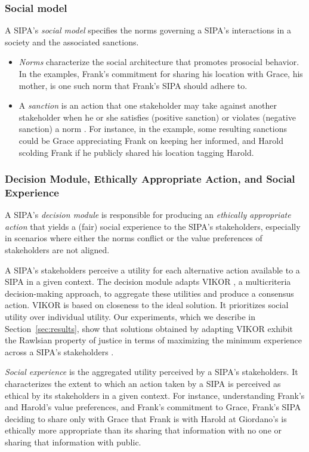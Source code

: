 \subsubsection{Social model} 
A SIPA's \emph{social model} specifies the norms governing a SIPA's interactions in a society and the associated sanctions. 
\begin{itemize}
\item \emph{Norms} characterize the social architecture that promotes prosocial behavior. In the \locationapp examples, Frank's commitment for sharing his location with Grace, his mother, is one such norm that Frank's \locationapp SIPA should adhere to. 
\item A \emph{sanction} is an action that one stakeholder may take against another stakeholder when he or she satisfies (positive sanction) or violates (negative sanction) a norm \citep{Nardin-KER16-Classifying}. For instance, in the \locationapp example, some resulting sanctions could be Grace appreciating Frank on keeping her informed, and Harold scolding Frank if he publicly shared his location tagging Harold. 
\end{itemize}

\subsubsection{Decision Module, Ethically Appropriate Action, and Social Experience}

A SIPA's \emph{decision module} is responsible for producing an \emph{ethically appropriate action} that yields a (fair) social experience to the SIPA's stakeholders, 
especially in scenarios where either the norms conflict or the value preferences 
of stakeholders are not aligned. 

A SIPA's stakeholders perceive a utility for each alternative action available to a SIPA in a given context. The decision module adapts VIKOR \citep{opricovic2004compromise}, a multicriteria decision-making approach, to aggregate these utilities and produce a consensus action. VIKOR is based on closeness to the ideal solution. It prioritizes social utility over individual utility. Our experiments, which we describe in Section~\ref{sec:results}, show that solutions obtained by \frameworkAinur adapting VIKOR exhibit the Rawlsian property of justice in terms of maximizing the minimum experience across a SIPA's stakeholders \citep{rawls1985justice,Leben2017Rawls}. 

\emph{Social experience} is the aggregated utility perceived by a SIPA's stakeholders. It characterizes the extent to which an action taken by a SIPA is perceived as ethical by its stakeholders in a given context. For instance, understanding Frank's and Harold's value preferences, and Frank's commitment to Grace, Frank's \locationapp SIPA deciding to share only with Grace that Frank is with Harold at Giordano's is ethically more appropriate than its sharing that information with no one or sharing that information with public. 

